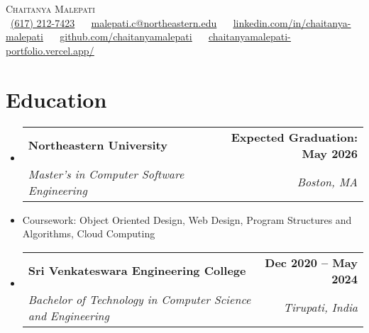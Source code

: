 \documentclass[letterpaper,11pt]{article}
\makeatletter
\newcommand{\resumeItem}[1]{
  \item\small{
    {#1 \vspace{0pt}}
  }
}
\newcommand{\resumeSubheading}[4]{
  \vspace{-2pt}\item
    \begin{tabular*}{1.0\textwidth}[t]{l@{\extracolsep{\fill}}r}
      \textbf{#1} & \textbf{\small #2} \\
      \textit{\small#3} & \textit{\small #4} \\
    \end{tabular*}\vspace{-7pt}
}
\newcommand{\resumeSubHeadingListStart}{\begin{itemize}[leftmargin=0.0in, label={}]}
\newcommand{\resumeSubHeadingListEnd}{\end{itemize}}\vspace{0pt}
\newcommand{\resumeItemListStart}{\begin{itemize}}
\newcommand{\resumeItemListEnd}{\end{itemize}\vspace{-5pt}}
\makeatother
\begin{document}
\begin{center}
    {\Large \scshape Chaitanya Malepati} \\[2mm]
    \footnotesize \raisebox{-0.1\height}
    \faPhone\ \underline{(617) 212-7423} ~ 
    {\faEnvelope\  \underline{malepati.c@northeastern.edu}} ~ 
    {\faLinkedin\ \underline{\href{https://www.linkedin.com/in/chaitanya-malepati/}{linkedin.com/in/chaitanya-malepati}}}  ~
    {\faGithub\ \underline{\href{https://github.com/chaitanyamalepati}{github.com/chaitanyamalepati}}} ~
    {\faBriefcase\ \underline{\href{https://chaitanyamalepati-portfolio.vercel.app/}{chaitanyamalepati-portfolio.vercel.app/}}}
    \vspace{-8pt}
\end{center}


\section{Education}
  \resumeSubHeadingListStart
    \resumeSubheading
      {Northeastern University}{Expected Graduation: May 2026}
      {Master's in Computer Software Engineering}{Boston, MA}
  \resumeSubHeadingListEnd
    \resumeItemListStart
        \resumeItem{Coursework: Object Oriented Design, Web Design, Program Structures and Algorithms, Cloud Computing}
    \resumeItemListEnd
    
    \resumeSubHeadingListStart
    \resumeSubheading
      {Sri Venkateswara Engineering College}{Dec 2020 -- May 2024}
      {Bachelor of Technology in Computer Science and Engineering}{Tirupati, India}
    \resumeSubHeadingListEnd
    \vspace{-12pt}

\end{document}
